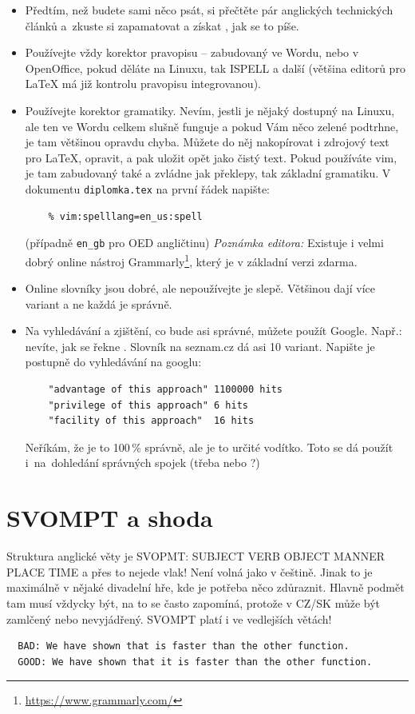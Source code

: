 \begin{itemize}
  \item{Předtím, než budete sami něco psát, si přečtěte pár anglických technických článků a~zkuste si zapamatovat a získat , jak se to píše.}
  \item{Používejte vždy korektor pravopisu -- zabudovaný ve Wordu, nebo v OpenOffice, pokud děláte na Linuxu, tak ISPELL a další (většina editorů pro \LaTeX{} má již kontrolu pravopisu integrovanou).}
  \item{Používejte korektor gramatiky. Nevím, jestli je nějaký dostupný na Linuxu, ale ten ve Wordu celkem slušně funguje a pokud Vám něco zelené podtrhne, je tam většinou opravdu chyba. Můžete do něj nakopírovat i zdrojový text pro \LaTeX{}, opravit, a pak uložit opět jako čistý text. Pokud používáte vim, je tam zabudovaný také a zvládne jak překlepy, tak základní gramatiku. V dokumentu \texttt{diplomka.tex} na první řádek napište:
  \begin{verbatim}
    % vim:spelllang=en_us:spell
  \end{verbatim}
  (případně \texttt{en\_gb} pro OED angličtinu)
  \textit{Poznámka editora:} Existuje i velmi dobrý online nástroj Grammarly\footnote{\url{https://www.grammarly.com/}}, který je v základní verzi zdarma.
  }
  \item{Online slovníky jsou dobré, ale nepoužívejte je slepě. Většinou dají více variant a ne každá je správně.}
  \item{\begin{samepage}Na vyhledávání a zjištění, co bude asi správné, můžete použít Google. Např.: nevíte, jak se řekne . Slovník na seznam.cz dá asi 10 variant. Napište je postupně do vyhledávání na googlu:
  \begin{verbatim}
    "advantage of this approach" 1100000 hits
    "privilege of this approach" 6 hits
    "facility of this approach"  16 hits
  \end{verbatim}
  Neříkám, že je to 100\,\% správně, ale je to určité vodítko. Toto se dá použít i~na~dohledání správných spojek (třeba  nebo ?)\end{samepage}}
\end{itemize}

\section*{SVOMPT a shoda}

Struktura anglické věty je SVOPMT: SUBJECT VERB OBJECT MANNER PLACE TIME a přes to nejede vlak! Není volná jako v češtině. Jinak to je maximálně v nějaké divadelní hře, kde je potřeba něco zdůraznit. Hlavně podmět tam musí vždycky být, na to se často zapomíná, protože v CZ/SK může být zamlčený nebo nevyjádřený. SVOMPT platí i ve vedlejších větách!
\begin{verbatim}
  BAD: We have shown that is faster than the other function.
  GOOD: We have shown that it is faster than the other function.
\end{verbatim}

